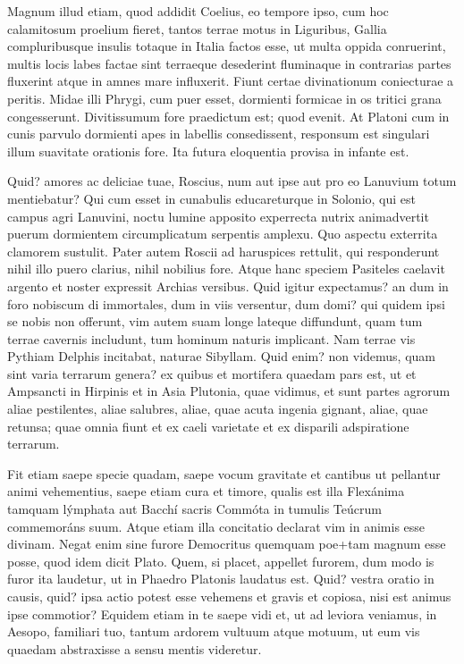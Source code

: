  Magnum illud etiam, quod addidit Coelius, eo tempore ipso, cum hoc calamitosum proelium fieret, tantos terrae motus in Liguribus, Gallia compluribusque insulis totaque in Italia factos esse, ut multa oppida conruerint, multis locis labes factae sint terraeque desederint fluminaque in contrarias partes fluxerint atque in amnes mare influxerit. Fiunt certae divinationum coniecturae a peritis. Midae illi Phrygi, cum puer esset, dormienti formicae in os tritici grana congesserunt. Divitissumum fore praedictum est; quod evenit. At Platoni cum in cunis parvulo dormienti apes in labellis consedissent, responsum est singulari illum suavitate orationis fore. Ita futura eloquentia provisa in infante est.

 Quid? amores ac deliciae tuae, Roscius, num aut ipse aut pro eo Lanuvium totum mentiebatur? Qui cum esset in cunabulis educareturque in Solonio, qui est campus agri Lanuvini, noctu lumine apposito experrecta nutrix animadvertit puerum dormientem circumplicatum serpentis amplexu. Quo aspectu exterrita clamorem sustulit. Pater autem Roscii ad haruspices rettulit, qui responderunt nihil illo puero clarius, nihil nobilius fore. Atque hanc speciem Pasiteles caelavit argento et noster expressit Archias versibus. Quid igitur expectamus? an dum in foro nobiscum di immortales, dum in viis versentur, dum domi? qui quidem ipsi se nobis non offerunt, vim autem suam longe lateque diffundunt, quam tum terrae cavernis includunt, tum hominum naturis implicant. Nam terrae vis Pythiam Delphis incitabat, naturae Sibyllam. Quid enim? non videmus, quam sint varia terrarum genera? ex quibus et mortifera quaedam pars est, ut et Ampsancti in Hirpinis et in Asia Plutonia, quae vidimus, et sunt partes agrorum aliae pestilentes, aliae salubres, aliae, quae acuta ingenia gignant, aliae, quae retunsa; quae omnia fiunt et ex caeli varietate et ex disparili adspiratione terrarum.

 Fit etiam saepe specie quadam, saepe vocum gravitate et cantibus ut pellantur animi vehementius, saepe etiam cura et timore, qualis est illa Flexánima tamquam lýmphata aut Bacchí sacris Commóta in tumulis Teúcrum commemoráns suum. Atque etiam illa concitatio declarat vim in animis esse divinam. Negat enim sine furore Democritus quemquam poe+tam magnum esse posse, quod idem dicit Plato. Quem, si placet, appellet furorem, dum modo is furor ita laudetur, ut in Phaedro Platonis laudatus est. Quid? vestra oratio in causis, quid? ipsa actio potest esse vehemens et gravis et copiosa, nisi est animus ipse commotior? Equidem etiam in te saepe vidi et, ut ad leviora veniamus, in Aesopo, familiari tuo, tantum ardorem vultuum atque motuum, ut eum vis quaedam abstraxisse a sensu mentis videretur.

